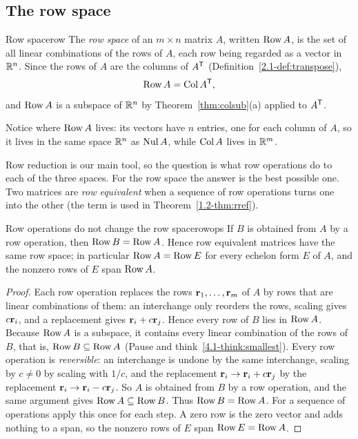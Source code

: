 \documentclass[11pt]{article}
\begin{document}
\subsection*{The row space}

\begin{defn}{Row space}{row}
The \emph{row space} of an $m\times n$ matrix $A$, written $\operatorname{Row} A$, is the set of all linear combinations of the rows of $A$, each row being regarded as a vector in $\mathbb{R}^n$. Since the rows of $A$ are the columns of $A^{\mathsf T}$ (Definition~\ref{2.1-def:transpose}),
\[
\operatorname{Row} A=\operatorname{Col} A^{\mathsf T},
\]
and $\operatorname{Row} A$ is a subspace of $\mathbb{R}^n$ by Theorem~\ref{thm:colsub}(a) applied to $A^{\mathsf T}$.
\end{defn}

Notice where $\operatorname{Row} A$ lives: its vectors have $n$ entries, one for each column of $A$, so it lives in the same space $\mathbb{R}^n$ as $\operatorname{Nul} A$, while $\operatorname{Col} A$ lives in $\mathbb{R}^m$.

Row reduction is our main tool, so the question is what row operations do to each of the three spaces. For the row space the answer is the best possible one. Two matrices are \emph{row equivalent} when a sequence of row operations turns one into the other (the term is used in Theorem~\ref{1.2-thm:rref}).

\begin{thm}{Row operations do not change the row space}{rowops}
If $B$ is obtained from $A$ by a row operation, then $\operatorname{Row} B=\operatorname{Row} A$. Hence row equivalent matrices have the same row space; in particular $\operatorname{Row} A=\operatorname{Row} E$ for every echelon form $E$ of $A$, and the nonzero rows of $E$ span $\operatorname{Row} A$.
\end{thm}

\begin{proof}
Each row operation replaces the rows $\mathbf{r}_1,\dots,\mathbf{r}_m$ of $A$ by rows that are linear combinations of them: an interchange only reorders the rows, scaling gives $c\mathbf{r}_i$, and a replacement gives $\mathbf{r}_i+c\mathbf{r}_j$. Hence every row of $B$ lies in $\operatorname{Row} A$. Because $\operatorname{Row} A$ is a subspace, it contains every linear combination of the rows of $B$, that is, $\operatorname{Row} B\subseteq\operatorname{Row} A$ (Pause and think~\ref{4.1-think:smallest}). Every row operation is \emph{reversible}: an interchange is undone by the same interchange, scaling by $c\neq0$ by scaling with $1/c$, and the replacement $\mathbf{r}_i\to\mathbf{r}_i+c\mathbf{r}_j$ by the replacement $\mathbf{r}_i\to\mathbf{r}_i-c\mathbf{r}_j$. So $A$ is obtained from $B$ by a row operation, and the same argument gives $\operatorname{Row} A\subseteq\operatorname{Row} B$. Thus $\operatorname{Row} B=\operatorname{Row} A$. For a sequence of operations apply this once for each step. A zero row is the zero vector and adds nothing to a span, so the nonzero rows of $E$ span $\operatorname{Row} E=\operatorname{Row} A$.
\end{proof}
\end{document}
